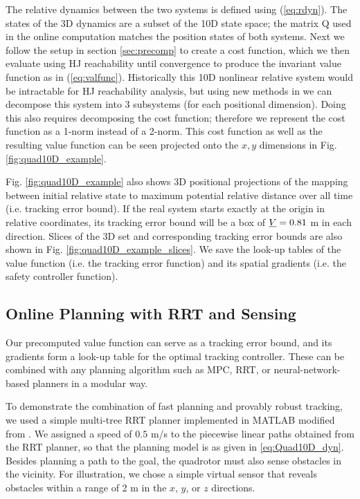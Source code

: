 The relative dynamics between the two systems is defined using (\ref{eq:rdyn}). The states of the 3D dynamics are a subset of the 10D state space; the matrix Q used in the online computation matches the position states of both systems. Next we follow the setup in section \ref{sec:precomp} to create a cost function, which we then evaluate using HJ reachability until convergence to produce the invariant value function as in (\ref{eq:valfunc}). Historically this 10D nonlinear relative system would be intractable for HJ reachability analysis, but using new methods in \cite{Chen2016DecouplingExact, Chen2016DecouplingJournal} we can decompose this system into 3 subsystems (for each positional dimension). Doing this also requires decomposing the cost function; therefore we represent the cost function as a 1-norm instead of a 2-norm. This cost function as well as the resulting value function can be seen projected onto the $x,y$ dimensions in Fig. \ref{fig:quad10D_example}.

Fig. \ref{fig:quad10D_example} also shows 3D positional projections of the mapping between initial relative state to maximum potential relative distance over all time (i.e. tracking error bound). If the real system starts exactly at the origin in relative coordinates, its tracking error bound will be a box of $\underline{V} = 0.81$ m in each direction. Slices of the 3D set and corresponding tracking error bounds are also shown in Fig. \ref{fig:quad10D_example_slices}. We save the look-up tables of the value function (i.e. the tracking error function) and its spatial gradients (i.e. the safety controller function).

\subsection{Online Planning with RRT and Sensing}
Our precomputed value function can serve as a tracking error bound, and its gradients form a look-up table for the optimal tracking controller. These can be combined with any planning algorithm such as MPC, RRT, or neural-network-based planners in a modular way. 

To demonstrate the combination of fast planning and provably robust tracking, we used a simple multi-tree RRT planner implemented in MATLAB modified from \cite{Gavin2013}. We assigned a speed of $0.5$ m/s to the piecewise linear paths obtained from the RRT planner, so that the planning model is as given in \eqref{eq:Quad10D_dyn}. Besides planning a path to the goal, the quadrotor must also sense obstacles in the vicinity. For illustration, we chose a simple virtual sensor that reveals obstacles within a range of 2 m in the $x$, $y$, or $z$ directions.

